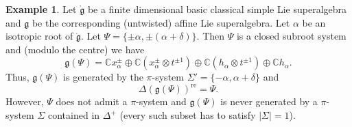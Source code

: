 \documentclass[11pt,reqno]{amsart}
\theoremstyle{plain}
\theoremstyle{definition}
\newtheorem*{example}{Example}
\theoremstyle{remark}
\newcommand{\lie}[1]{\mathfrak{#1}}
\newcommand\bc{\mathbb C}
\numberwithin{equation}{section}
\begin{document}
\begin{example}\label{thenonexample1}
Let $\mathring{\lie g}$ be a finite dimensional basic classical simple Lie superalgebra and $\lie g$ be the corresponding (untwisted) affine Lie superalgebra. Let $\alpha$ be an isotropic root of $\mathring{\lie g}.$ Let $\Psi=\{\pm \alpha,\pm(\alpha+\delta)\}.$ Then $\Psi$ is a closed subroot system and (modulo the centre) we have $$\lie g(\Psi)=\bc x_\alpha^\pm\oplus \bc(x_\alpha^\pm\otimes  t^{\pm 1})\oplus \bc (h_\alpha\otimes t^{\pm 1})\oplus \bc h_\alpha.$$ 
Thus, $\lie g(\Psi)$ is generated by the $\pi$-system $\Sigma'=\{-\alpha,\alpha+\delta\}$ and 
$$\Delta(\lie g(\Psi))^{\mathrm{re}}=\Psi.$$ 
However, $\Psi$ does not admit a $\pi$-system and $\lie g(\Psi)$ is never generated by a $\pi$-system $\Sigma$ contained in $\Delta^+$ (every such subset has to satisfy $|\Sigma|=1$). 
\end{example}
\end{document}
